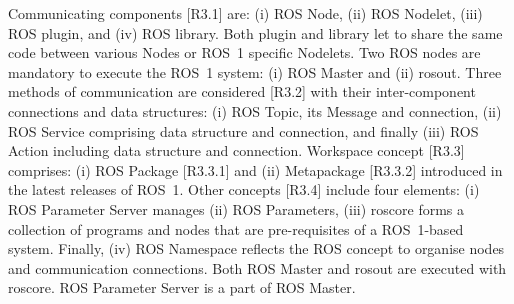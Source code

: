 \documentclass[11pt,oneside,a4paper]{article}
\begin{document}
	Communicating components [R3.1] are: (i) ROS Node, (ii) ROS Nodelet, (iii) ROS plugin, and (iv) ROS library. Both plugin and library let to share the same code between various Nodes or ROS~1 specific Nodelets. Two ROS nodes are mandatory to execute the ROS~1 system: (i) ROS Master and (ii) rosout.
	 Three methods of communication are considered [R3.2] with their inter-component connections and data structures: (i) ROS Topic, its Message and connection, (ii) ROS Service comprising data structure and connection, and finally (iii) ROS Action including data structure and connection.
	Workspace concept [R3.3] comprises: (i) ROS Package [R3.3.1] and (ii) Metapackage [R3.3.2] introduced in the latest releases of ROS~1.
	Other concepts [R3.4] include four elements: (i) ROS Parameter Server manages (ii) ROS Parameters, (iii) roscore forms a collection of programs and nodes that are pre-requisites of a ROS~1-based system. Finally, (iv) ROS Namespace reflects the ROS concept to organise nodes and communication connections. Both ROS Master and rosout are executed with roscore. ROS Parameter Server is a part of ROS Master.
\end{document}
